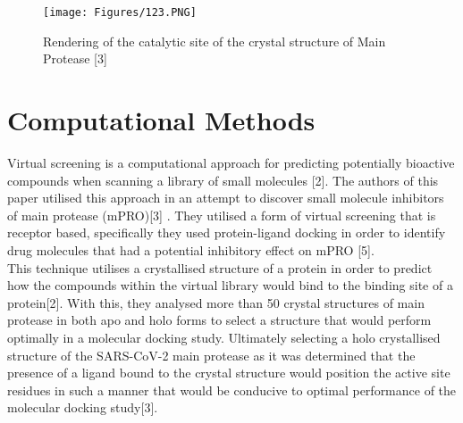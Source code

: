 \documentclass[
]{article}
\begin{document}
\begin{figure}

{\centering \texttt{[image: Figures/123.PNG]}

}

\caption{Rendering of the catalytic site of the crystal structure of
Main Protease {[}3{]}}

\end{figure}

\hypertarget{computational-methods}{%
\section{Computational Methods}\label{computational-methods}}

Virtual screening is a computational approach for predicting potentially
bioactive compounds when scanning a library of small molecules {[}2{]}.
The authors of this paper utilised this approach in an attempt to
discover small molecule inhibitors of main protease (mPRO){[}3{]} . They
utilised a form of virtual screening that is receptor based,
specifically they used protein-ligand docking in order to identify drug
molecules that had a potential inhibitory effect on mPRO {[}5{]}.\\

This technique utilises a crystallised structure of a protein in order
to predict how the compounds within the virtual library would bind to
the binding site of a protein{[}2{]}. With this, they analysed more than
50 crystal structures of main protease in both apo and holo forms to
select a structure that would perform optimally in a molecular docking
study. Ultimately selecting a holo crystallised structure of the
SARS-CoV-2 main protease as it was determined that the presence of a
ligand bound to the crystal structure would position the active site
residues in such a manner that would be conducive to optimal performance
of the molecular docking study{[}3{]}.
\end{document}
